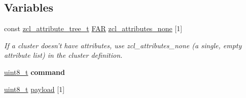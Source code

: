\subsection*{Variables}
\begin{DoxyCompactItemize}
\item 
const \hyperlink{structzcl__attribute__tree__t}{zcl\-\_\-attribute\-\_\-tree\-\_\-t} \hyperlink{group__hal_gaef060b3456fdcc093a7210a762d5f2ed}{F\-A\-R} \hyperlink{group__zcl_gad1e7f7dd501a7ab02f6004e4091c6bea}{zcl\-\_\-attributes\-\_\-none} \mbox{[}1\mbox{]}
\begin{DoxyCompactList}\small\item\em If a cluster doesn't have attributes, use zcl\-\_\-attributes\-\_\-none (a single, empty attribute list) in the cluster definition. \end{DoxyCompactList}\item 
\hypertarget{group__zcl_ga1a5aaa930940857f68f245eeb89506b5}{\hyperlink{group__hal_gae1affc9ca37cfb624959c866a73f83c2}{uint8\-\_\-t} {\bfseries command}}\label{group__zcl_ga1a5aaa930940857f68f245eeb89506b5}

\item 
\hypertarget{group__zcl_gacb1403989580c30b5cac60f347c5d6ab}{\hyperlink{group__hal_gae1affc9ca37cfb624959c866a73f83c2}{uint8\-\_\-t} \hyperlink{group__zcl_gacb1403989580c30b5cac60f347c5d6ab}{payload} \mbox{[}1\mbox{]}}\label{group__zcl_gacb1403989580c30b5cac60f347c5d6ab}


\end{DoxyCompactItemize}
